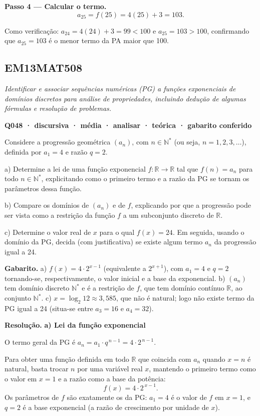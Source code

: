 \documentclass[11pt,a4paper]{article}
\begin{document}
\textbf{Passo 4 — Calcular o termo.}
$$a_{25} = f(25) = 4(25) + 3 = 103.$$

Como verificação: $a_{24} = 4(24)+3 = 99 < 100$ e $a_{25} = 103 > 100$, confirmando que $a_{25}=103$ é o menor termo da PA maior que 100.
\subsection*{EM13MAT508}
{\small\itshape Identificar e associar sequências numéricas (PG) a funções exponenciais de domínios discretos para análise de propriedades, incluindo dedução de algumas fórmulas e resolução de problemas.}

\bigskip\noindent\textbf{Q048 · discursiva · média · analisar · teórica · gabarito conferido}\par\nopagebreak
Considere a progressão geométrica $(a_n)$, com $n \in \mathbb{N}^{*}$ (ou seja, $n = 1, 2, 3, \dots$), definida por $a_1 = 4$ e razão $q = 2$.

a) Determine a lei de uma função exponencial $f:\mathbb{R}\to\mathbb{R}$ tal que $f(n) = a_n$ para todo $n \in \mathbb{N}^{*}$, explicitando como o primeiro termo e a razão da PG se tornam os parâmetros dessa função.

b) Compare os domínios de $(a_n)$ e de $f$, explicando por que a progressão pode ser vista como a restrição da função $f$ a um subconjunto discreto de $\mathbb{R}$.

c) Determine o valor real de $x$ para o qual $f(x) = 24$. Em seguida, usando o domínio da PG, decida (com justificativa) se existe algum termo $a_n$ da progressão igual a 24.

\textbf{Gabarito.} a) $f(x) = 4\cdot 2^{x-1}$ (equivalente a $2^{x+1}$), com $a_1=4$ e $q=2$ tornando-se, respectivamente, o valor inicial e a base da exponencial. b) $(a_n)$ tem domínio discreto $\mathbb{N}^{*}$ e é a restrição de $f$, que tem domínio contínuo $\mathbb{R}$, ao conjunto $\mathbb{N}^{*}$. c) $x=\log_2 12\approx 3{,}585$, que não é natural; logo não existe termo da PG igual a 24 (situa-se entre $a_3=16$ e $a_4=32$).

\textbf{Resolução.} \textbf{a) Lei da função exponencial}

O termo geral da PG é $a_n = a_1 \cdot q^{\,n-1} = 4\cdot 2^{\,n-1}$.

Para obter uma função definida em todo $\mathbb{R}$ que coincida com $a_n$ quando $x=n$ é natural, basta trocar $n$ por uma variável real $x$, mantendo o primeiro termo como o valor em $x=1$ e a razão como a base da potência:
$$f(x) = 4\cdot 2^{\,x-1}.$$
Os parâmetros de $f$ são exatamente os da PG: $a_1=4$ é o valor de $f$ em $x=1$, e $q=2$ é a base exponencial (a razão de crescimento por unidade de $x$).
\end{document}
